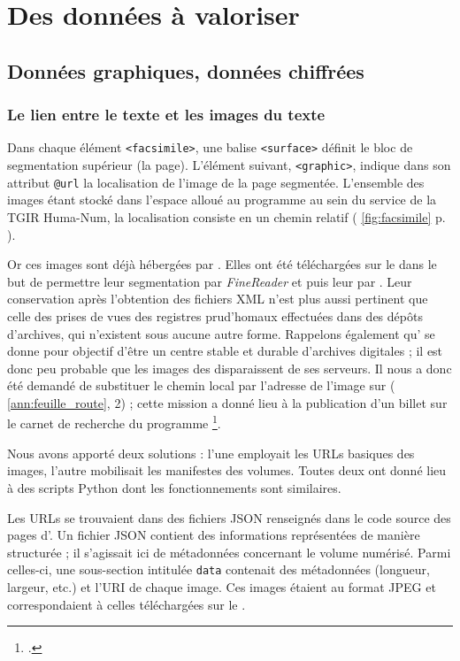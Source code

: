 \part{Des données à valoriser}

\clearpage
\thispagestyle{empty}
\cleardoublepage

\chapter{Données graphiques, données chiffrées}

\section{Le lien entre le texte et les images du texte}

Dans chaque élément \texttt{<facsimile>}, une balise \texttt{<surface>} définit le bloc de segmentation supérieur (la page). L'élément suivant, \texttt{<graphic>}, indique dans son attribut \texttt{@url} la localisation de l'image de la page segmentée. L'ensemble des images étant stocké dans l'espace alloué au programme \timeus{} au sein du service \sharedocs{} de la TGIR Huma-Num, la localisation consiste en un chemin relatif (\fig{} \ref{fig:facsimile} p. \pageref{fig:facsimile}).

Or ces images sont déjà hébergées par \ia. Elles ont été téléchargées sur le \sharedocs{} dans le but de permettre leur segmentation par \textit{FineReader} et \transkribus{} puis leur \ocr{} par \lse. Leur conservation après l'obtention des fichiers XML n'est plus aussi pertinent que celle des prises de vues des registres prud'homaux effectuées dans des dépôts d'archives, qui n'existent sous aucune autre forme. Rappelons également qu'\ia{} se donne pour objectif d’être un centre stable et durable d’archives digitales ; il est donc peu probable que les images des \odm{} disparaissent de ses serveurs. Il nous a donc été demandé de substituer le chemin local par l'adresse de l'image sur \ia{} (\ann{} \ref{ann:feuille_route}, \issue{} 2) ; cette mission a donné lieu à la publication d'un billet sur le carnet de recherche du programme \timeus\footcite{genero}.

Nous avons apporté deux solutions : l'une employait les URLs basiques des images, l'autre mobilisait les manifestes \iiif{} des volumes. Toutes deux ont donné lieu à des scripts Python dont les fonctionnements sont similaires.

Les URLs se trouvaient dans des fichiers JSON renseignés dans le code source des pages d'\ia. Un fichier JSON contient des informations représentées de manière structurée ; il s'agissait ici de métadonnées concernant le volume numérisé. Parmi celles-ci, une sous-section intitulée \texttt{data} contenait des métadonnées (longueur, largeur, etc.) et l'URI de chaque image. Ces images étaient au format JPEG et correspondaient à celles téléchargées sur le \sharedocs. 

